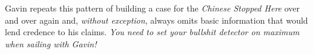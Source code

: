 Gavin repeats this pattern of building a case for the \emph{Chinese
Stopped Here} over and over again and, \emph{without exception}, always
omits basic information that would lend credence to his claims.
\emph{You need to set your bullshit detector on maximum when sailing
with Gavin!}


%
